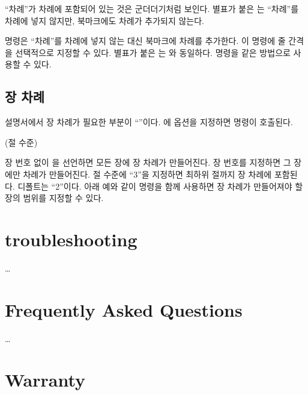 \documentclass[minted]{hzguide}
\begin{document}
``차례''가 차례에 포함되어 있는 것은 군더더기처럼 보인다.
별표가 붙은 \macro{\tableofcontents*}는 ``차례''를 차례에 넣지 않지만, 북마크에도 차례가 추가되지 않는다.

\begin{code}
\TableOfContents[줄 간격]
\TableOfContents*[1.1]
\ListOfFigures[줄 간격]
\end{code}

\macro{\TableOfContents} 명령은 ``차례''를 차례에 넣지 않는 대신 북마크에 차례를 추가한다.
이 명령에 줄 간격을 선택적으로 지정할 수 있다.
별표가 붙은 \macro{\TableOfContents*}는 \macro{\tableofcontents}와 동일하다.
\macro{\ListOfFigures} 명령을 같은 방법으로 사용할 수 있다.

\section{장 차례}

설명서에서 장 차례가 필요한 부분이 ``''이다.
\macro{\HeadingSetup}에  옵션을 지정하면 \macro{\ChapterContentsEnable} 명령이 호출된다.

\begin{code}
\ChapterContentsEnable[장 번호](절 수준)
\ChapterContentsDisable
\end{code}

장 번호 없이 \macro{\ChapterContentsEnable}을 선언하면 모든 장에 장 차례가 만들어진다.
장 번호를 지정하면 그 장에만 차례가 만들어진다.
절 수준에 ``3''을 지정하면 최하위 절\annotate*{\string\subsubsection}까지 장 차례에 포함된다.
디폴트는 ``2''\annotate*{\string\subsection}이다.
아래 예와 같이 \macro{\ChapterContentsDisable} 명령을 함께 사용하면 장 차례가 만들어져야 할 장의 범위를 지정할 수 있다.

\begin{code}
\ChapterContentsEnable
\chapter{troubleshooting}
… 
\chapter{Frequently Asked Questions}
…
\ChapterContentsDisable
\chapter{Warranty}
\end{code}
\end{document}
